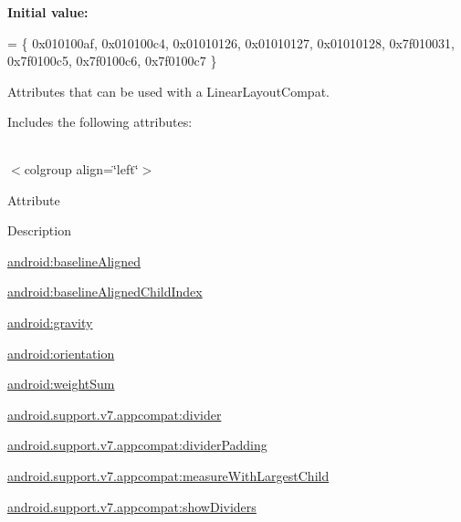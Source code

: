 {\bfseries Initial value\+:}
\begin{DoxyCode}
= \{
            0x010100af, 0x010100c4, 0x01010126, 0x01010127,
            0x01010128, 0x7f010031, 0x7f0100c5, 0x7f0100c6,
            0x7f0100c7
        \}
\end{DoxyCode}
Attributes that can be used with a Linear\+Layout\+Compat. 

Includes the following attributes\+:

\tabulinesep=1mm
\begin{longtabu} spread 0pt [c]{*{0}{|X[-1]}|}
\hline
\end{longtabu}
$<$colgroup align=\char`\"{}left\char`\"{}$>$ 

Attribute

Description 

{\ttfamily \hyperlink{classandroid_1_1support_1_1v7_1_1appcompat_1_1R_1_1styleable_a2ab23befda4596dd9b3123293c0c7363}{android\+:baseline\+Aligned}}

{\ttfamily \hyperlink{classandroid_1_1support_1_1v7_1_1appcompat_1_1R_1_1styleable_af06bece97e887762a7014b0f2cc556b3}{android\+:baseline\+Aligned\+Child\+Index}}

{\ttfamily \hyperlink{classandroid_1_1support_1_1v7_1_1appcompat_1_1R_1_1styleable_a1a79155cc159491b1b7a5cdcc1151129}{android\+:gravity}}

{\ttfamily \hyperlink{classandroid_1_1support_1_1v7_1_1appcompat_1_1R_1_1styleable_a72c55918aae02ccc8eedaf1fd22650d0}{android\+:orientation}}

{\ttfamily \hyperlink{classandroid_1_1support_1_1v7_1_1appcompat_1_1R_1_1styleable_af4156d93fb0f23063721a22e35a2d57f}{android\+:weight\+Sum}}

{\ttfamily \hyperlink{classandroid_1_1support_1_1v7_1_1appcompat_1_1R_1_1styleable_aea914902102e3572b7009f55ad727a9b}{android.\+support.\+v7.\+appcompat\+:divider}}

{\ttfamily \hyperlink{classandroid_1_1support_1_1v7_1_1appcompat_1_1R_1_1styleable_aaa2b07fcbbf44f3762755b98ba2e1415}{android.\+support.\+v7.\+appcompat\+:divider\+Padding}}

{\ttfamily \hyperlink{classandroid_1_1support_1_1v7_1_1appcompat_1_1R_1_1styleable_a6d10c5bf4d8bc31c3f749f3b7a15cb79}{android.\+support.\+v7.\+appcompat\+:measure\+With\+Largest\+Child}}

{\ttfamily \hyperlink{classandroid_1_1support_1_1v7_1_1appcompat_1_1R_1_1styleable_a18ec21806877ae05158a519df038e895}{android.\+support.\+v7.\+appcompat\+:show\+Dividers}}

